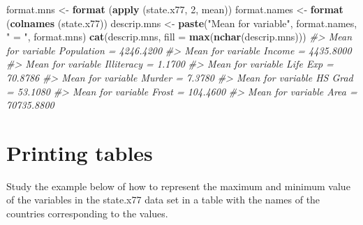 \documentclass[
]{book}
\newenvironment{Shaded}{\begin{snugshade}}{\end{snugshade}}
\newcommand{\AttributeTok}[1]{\textcolor[rgb]{0.13,0.29,0.53}{#1}}
\newcommand{\CommentTok}[1]{\textcolor[rgb]{0.56,0.35,0.01}{\textit{#1}}}
\newcommand{\DecValTok}[1]{\textcolor[rgb]{0.00,0.00,0.81}{#1}}
\newcommand{\FunctionTok}[1]{\textcolor[rgb]{0.13,0.29,0.53}{\textbf{#1}}}
\newcommand{\NormalTok}[1]{#1}
\newcommand{\OtherTok}[1]{\textcolor[rgb]{0.56,0.35,0.01}{#1}}
\newcommand{\StringTok}[1]{\textcolor[rgb]{0.31,0.60,0.02}{#1}}
\begin{document}
\begin{Shaded}
\begin{Highlighting}[]
\NormalTok{format.mns }\OtherTok{\textless{}{-}} \FunctionTok{format}\NormalTok{ (}\FunctionTok{apply}\NormalTok{ (state.x77, }\DecValTok{2}\NormalTok{, mean))}
\NormalTok{format.names }\OtherTok{\textless{}{-}} \FunctionTok{format}\NormalTok{ (}\FunctionTok{colnames}\NormalTok{ (state.x77))}
\NormalTok{descrip.mns }\OtherTok{\textless{}{-}} \FunctionTok{paste}\NormalTok{(}\StringTok{"Mean for variable"}\NormalTok{, format.names, }\StringTok{" = "}\NormalTok{, format.mns)}
\FunctionTok{cat}\NormalTok{(descrip.mns, }\AttributeTok{fill =} \FunctionTok{max}\NormalTok{(}\FunctionTok{nchar}\NormalTok{(descrip.mns)))}
\CommentTok{\#\textgreater{} Mean for variable Population  =   4246.4200 }
\CommentTok{\#\textgreater{} Mean for variable Income      =   4435.8000 }
\CommentTok{\#\textgreater{} Mean for variable Illiteracy  =      1.1700 }
\CommentTok{\#\textgreater{} Mean for variable Life Exp    =     70.8786 }
\CommentTok{\#\textgreater{} Mean for variable Murder      =      7.3780 }
\CommentTok{\#\textgreater{} Mean for variable HS Grad     =     53.1080 }
\CommentTok{\#\textgreater{} Mean for variable Frost       =    104.4600 }
\CommentTok{\#\textgreater{} Mean for variable Area        =  70735.8800}
\end{Highlighting}
\end{Shaded}

\section{Printing tables}\label{printing-tables}

Study the example below of how to represent the maximum and minimum value of the variables in the state.x77 data set in a table with the names of the countries corresponding to the values.
\end{document}
